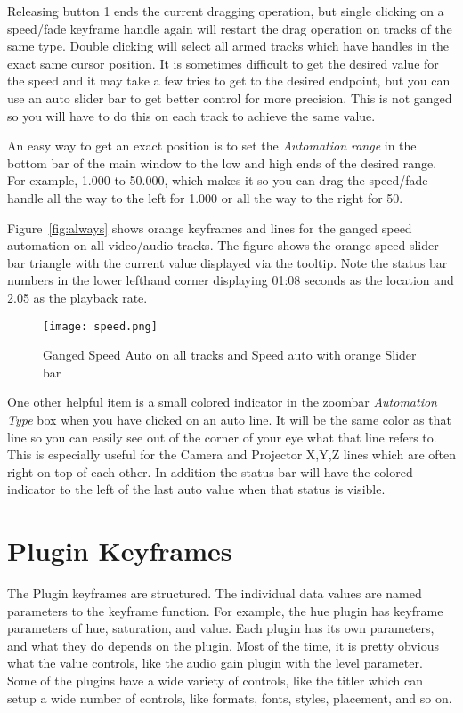 Releasing button 1 ends the current dragging operation, but single clicking on a speed/fade keyframe handle again will restart the drag operation on tracks of the same type.  Double clicking will select all armed tracks which have handles in the exact same cursor position.  It is sometimes difficult to get the desired value for the speed and it may take a few tries to get to the desired endpoint, but you can use an auto slider bar to get better control for more precision.  This is not ganged so you will have to do this on each track to achieve the same value.

An easy way to get an exact position is to set the \textit{Automation range} in the bottom bar of the main
window to the low and high ends of the desired range. For example, 1.000 to 50.000, which makes it
so you can drag the speed/fade handle all the way to the left for 1.000 or all the way to the right for 50.

Figure~\ref{fig:always} shows orange keyframes and lines for the ganged speed automation on all video/audio tracks. The figure shows the orange speed slider bar triangle with the current value displayed via the tooltip. Note the status bar numbers in the lower lefthand corner displaying 01:08 seconds as the location and 2.05 as the playback rate.

\begin{figure}[htpb]
    \centering
    \texttt{[image: speed.png]}
    \caption{Ganged Speed Auto on all tracks and Speed auto with orange Slider bar}
    \label{fig:speed}
\end{figure}

One other helpful item is a small colored indicator in the zoombar \textit{Automation Type} box when you have clicked on an auto line.  It will be the same color as that line so you can easily see out of the corner of your eye what that line refers to.  This is especially useful for the Camera and Projector X,Y,Z lines which are often right on top of each other.  In addition the status bar will have the colored indicator to the left of the last auto value when that status is visible.

\section{Plugin Keyframes}%
\label{sec:plugin_keyframe}

The Plugin keyframes are structured.  The individual data values are named parameters to the keyframe function.  For example, the hue plugin has keyframe parameters of hue, saturation, and value.  Each plugin has its own parameters, and what they do depends on the plugin.  Most of the time, it is pretty obvious what the value controls, like the audio gain plugin with the level parameter.  Some of the plugins have a wide variety of controls, like the titler which can setup a wide number of controls, like formats, fonts, styles, placement, and so on.

